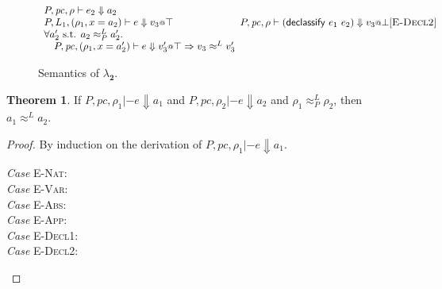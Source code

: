 \documentclass{article}
\makeatletter
\newcommand{\at}{\ensuremath{{\scriptstyle{@}}}}
\newcommand{\pc}{\ensuremath{{\mathit{pc}}}}
\theoremstyle{definition}
\newtheorem{theorem}{Theorem}
\makeatother
\begin{document}
\begin{figure}[h]
\begin{gather*}
{{\begin{array}{l}
          \\
          P, \pc, \rho |- e_2 \Downarrow a_2
          \\
          P, L_1, (\rho_1, x = a_2) |- e \Downarrow v_3 \at \top
          \\
          \forall{a_2' \text{ s.t. } a_2 \approx^{L}_{P} a_2'}.\, 
          \\\quad
          P, \pc, (\rho_1, x = a_2') |- e \Downarrow v_3' \at \top =>
          v_3 \approx^{L} v_3'
        \end{array}}
    }{
      P, \pc, \rho |- (\mathsf{declassify}\ e_1\ e_2) \Downarrow v_3 \at \bot
    }[\textsc{E-Decl2}]
  \end{gather*}
  \caption{Semantics of $\lambda_{\mathbf{2}}$.}
  \label{fig:semantics}
\end{figure}

\begin{theorem}
  If $P, \pc, \rho_1 |- e \Downarrow a_1$ and
  $P, \pc, \rho_2 |- e \Downarrow a_2$ and
  $\rho_1 \approx^{L}_{P} \rho_2$, then
  $a_1 \approx^{L} a_2$.
\end{theorem}
\begin{proof}
  By induction on the derivation of $P, \pc, \rho_1 |- e \Downarrow a_1$.
  \begin{description}
  \item[\emph{Case} \textsc{E-Nat}:]
  \item[\emph{Case} \textsc{E-Var}:]
  \item[\emph{Case} \textsc{E-Abs}:]
  \item[\emph{Case} \textsc{E-App}:]
  \item[\emph{Case} \textsc{E-Decl1}:]
  \item[\emph{Case} \textsc{E-Decl2}:]
    \qedhere
  \end{description}
\end{proof}
\end{document}
